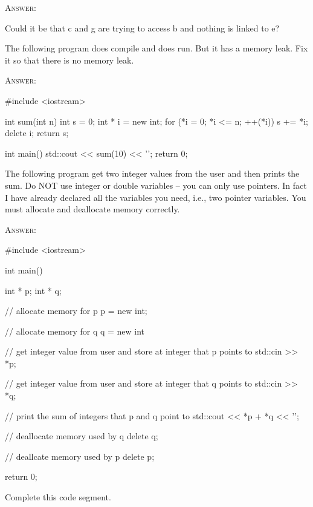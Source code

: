 \textsc{Answer:}
\begin{answercode}
Could it be that c and g are trying to access b and nothing is linked to e?


\end{answercode}

\newpage
\nextq
The following program does compile and does run. But it has a memory leak.
Fix it so that there is no memory leak.

\textsc{Answer:}
\begin{answercode}
#include <iostream>

int sum(int n)
{
    int s = 0;
    int * i = new int;
    for (*i = 0; *i <= n; ++(*i))
    {
        s += *i;
    }
    delete i;
    return s;
}

int main()
{
    std::cout << sum(10) << '\n';
    return 0;
}
\end{answercode}

\newpage
\nextq
The following program get two integer values from the user 
and then prints the sum.
Do NOT use integer or double variables -- you can only use pointers.
In fact I have already declared all the variables you need,
i.e., two pointer variables.
You must allocate and deallocate memory correctly.

\textsc{Answer:}
\begin{answercode}
#include <iostream>

int main()
{
    int * p;
    int * q;

    // allocate memory for p
    p = new int;


    // allocate memory for q
    q = new int

    // get integer value from user and store at integer that p points to
    std::cin >> *p;

    // get integer value from user and store at integer that q points to
    std::cin >> *q;

    // print the sum of integers that p and q point to
    std::cout << *p + *q << '\n';

    // deallocate memory used by q
    delete q;

    // deallcate memory used by p
    delete p;

    return 0;
}
\end{answercode}

\newpage
\nextq
Complete this code segment.


